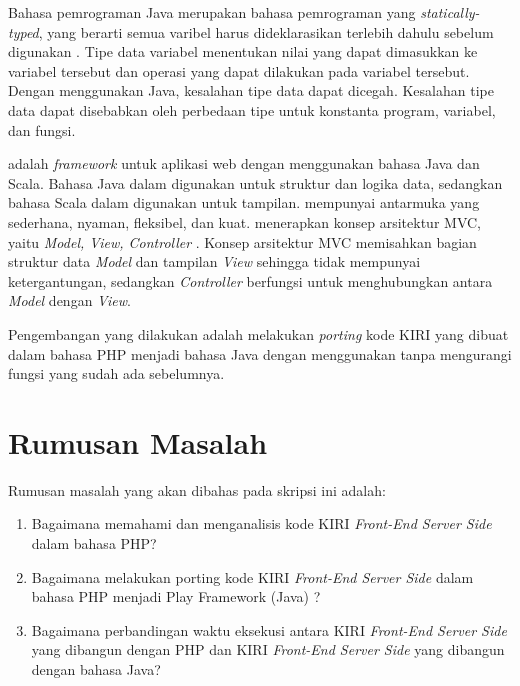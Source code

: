 Bahasa pemrograman Java merupakan bahasa pemrograman yang \textit{statically-typed}, yang berarti semua varibel harus dideklarasikan terlebih dahulu sebelum digunakan \cite{java}. Tipe data variabel menentukan nilai yang dapat dimasukkan ke variabel tersebut dan operasi yang dapat dilakukan pada variabel tersebut. Dengan menggunakan Java, kesalahan tipe data dapat dicegah. Kesalahan tipe data dapat disebabkan oleh perbedaan tipe untuk konstanta program, variabel, dan fungsi.

\play adalah \textit{framework} untuk aplikasi web dengan menggunakan bahasa Java dan Scala. Bahasa Java dalam \play digunakan untuk struktur dan logika data, sedangkan bahasa Scala dalam \play digunakan untuk tampilan. \play mempunyai antarmuka yang sederhana, nyaman, fleksibel, dan kuat. \play menerapkan konsep arsitektur MVC, yaitu \textit{Model, View, Controller} \cite{playforjava}. Konsep arsitektur MVC memisahkan bagian struktur data \textit{Model} dan tampilan \textit{View} sehingga tidak mempunyai ketergantungan, sedangkan \textit{Controller} berfungsi untuk menghubungkan antara \textit{Model} dengan \textit{View}.

Pengembangan yang dilakukan adalah melakukan \textit{porting} kode KIRI yang dibuat dalam bahasa PHP menjadi bahasa Java dengan menggunakan \play tanpa mengurangi fungsi yang sudah ada sebelumnya.

\section{Rumusan Masalah}
\label{rumusanMasalah}
Rumusan masalah yang akan dibahas pada skripsi ini adalah:
\begin{enumerate}
	\item Bagaimana memahami dan menganalisis kode KIRI \textit{Front-End Server Side} dalam bahasa PHP?
	\item Bagaimana melakukan porting kode KIRI \textit{Front-End Server Side} dalam bahasa PHP menjadi Play Framework (Java) ?
	\item Bagaimana perbandingan waktu eksekusi antara KIRI \textit{Front-End Server Side} yang dibangun dengan PHP dan KIRI \textit{Front-End Server Side} yang dibangun dengan bahasa Java?
\end{enumerate}

